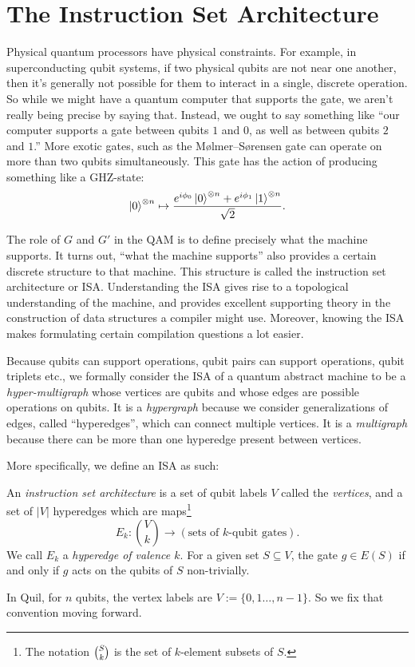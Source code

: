 \section{The Instruction Set Architecture}
Physical quantum processors have physical constraints. For example, in superconducting qubit systems, if two physical qubits are not near one another, then it's generally not possible for them to interact in a single, discrete operation. So while we might have a quantum computer that supports the \CNOT{} gate, we aren't really being precise by saying that. Instead, we ought to say something like ``our computer supports a \CNOT{} gate between qubits $1$ and $0$, as well as between qubits $2$ and $1$.'' More exotic gates, such as the M{\o}lmer--S{\o}rensen gate\cite{molmer} can operate on more than two qubits simultaneously. This gate has the action of producing something like a GHZ-state:
\begin{displaymath}
\ket{0}^{\otimes n} \mapsto \frac{e^{i\phi_0}\ket{0}^{\otimes n} + e^{i\phi_1}\ket{1}^{\otimes n}}{\sqrt{2}}.
\end{displaymath}

The role of $G$ and $G'$ in the QAM is to define precisely what the machine supports. It turns out, ``what the machine supports'' also provides a certain discrete structure to that machine. This structure is called the instruction set architecture or ISA. Understanding the ISA gives rise to a topological understanding of the machine, and provides excellent supporting theory in the construction of data structures a compiler might use. Moreover, knowing the ISA makes formulating certain compilation questions a lot easier.

Because qubits can support operations, qubit pairs can support operations, qubit triplets etc., we formally consider the ISA of a quantum abstract machine to be a \emph{hyper-multigraph} whose vertices are qubits and whose edges are possible operations on qubits. It is a \emph{hypergraph} because we consider generalizations of edges, called ``hyperedges'', which can connect multiple vertices. It is a \emph{multigraph} because there can be more than one hyperedge present between vertices.

More specifically, we define an ISA as such:

\begin{definition}
An \emph{instruction set architecture} is a set of qubit labels $V$ called the \emph{vertices}, and a set of $\vert V\vert$ hyperedges which are maps\footnote{The notation $\tbinom S k$ is the set of $k$-element subsets of $S$.}
\begin{displaymath}
    E_k : \binom V k \to (\text{sets of $k$-qubit gates}).
\end{displaymath}
We call $E_k$ a \emph{hyperedge of valence $k$}. For a given set $S\subseteq V$, the gate $g\in E(S)$ if and only if $g$ acts on the qubits of $S$ non-trivially.
\end{definition}
In Quil, for $n$ qubits, the vertex labels are $V:=\{0,1\ldots,n-1\}$. So we fix that convention moving forward.

